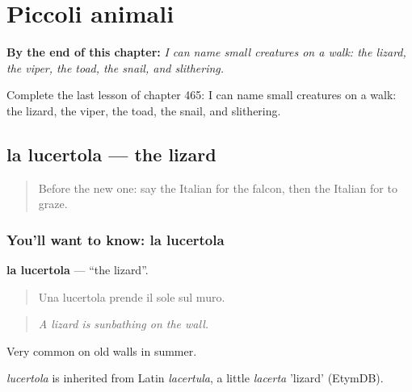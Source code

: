 
\chapter{Piccoli animali}
\label{ch:it-piccoli-animali}

\begin{chapteropening}
\textbf{By the end of this chapter:} \emph{I can name small creatures on a walk: the lizard, the viper, the toad, the snail, and slithering.}

Complete the last lesson of chapter 465: I can name small creatures on a walk: the lizard, the viper, the toad, the snail, and slithering.
\end{chapteropening}

\section[la lucertola]{la lucertola — the lizard}

\label{lesson:IT-C465-lucertola}



\begin{quote}
Before the new one: say the Italian for the falcon, then the Italian for to graze.
\end{quote}

\subsection*{You'll want to know: la lucertola}
\textbf{la lucertola} — \textquotedblleft{}the lizard\textquotedblright{}.

\begin{quote}
Una lucertola prende il sole sul muro.
\end{quote}

\begin{quote}
\emph{A lizard is sunbathing on the wall.}
\end{quote}

Very common on old walls in summer.

\begin{cousinweb}
\emph{lucertola} is inherited from Latin \emph{lacertula}, a little \emph{lacerta} 'lizard' (EtymDB).
\end{cousinweb}

